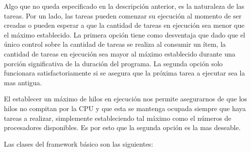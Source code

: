 Algo que no queda especificado en la descripción anterior, es la naturaleza de
las tareas. Por un lado, las tareas pueden comenzar su ejecución al momento de
ser creadas o pueden esperar a que la cantidad de tareas en ejecución sea menor
que el máximo establecido. La primera opción tiene como desventaja que dado que
el único control sobre la cantidad de tareas se realiza al consumir un ítem, la
cantidad de tareas en ejecución sea mayor al máximo establecido durante una
porción significativa de la duración del programa. La segunda opción solo
funcionara satisfactoriamente si se asegura que la próxima tarea a ejecutar sea
la mas antigua.

El establecer un máximo de hilos en ejecución nos permite asegurarnos de que los
hilos no compitan por la CPU y que esta se mantenga ocupada siempre que haya
tareas a realizar, simplemente estableciendo tal máximo como el números de
procesadores disponibles. Es por esto que la segunda opción es la mas deseable.

Las clases del framework básico son las siguientes:

